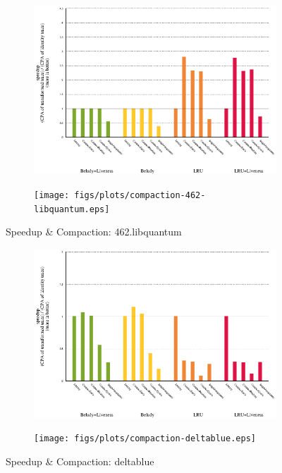 \begin{figure}[!ht]
  \begin{subfigure}[b]{0.5\textwidth}%
    \includegraphics[width=\textwidth]{figs/plots/speedup-462-libquantum.eps}
  \end{subfigure}%
  \begin{subfigure}[b]{0.5\textwidth}%
    \texttt{[image: figs/plots/compaction-462-libquantum.eps]}
  \end{subfigure}%
    \caption{Speedup \& Compaction: 462.libquantum}
  \label{fig:speedup-compaction-462-libquantum}
\end{figure}

\begin{figure}[!ht]
  \begin{subfigure}[b]{0.5\textwidth}%
    \includegraphics[width=\textwidth]{figs/plots/speedup-deltablue.eps}
  \end{subfigure}%
  \begin{subfigure}[b]{0.5\textwidth}%
    \texttt{[image: figs/plots/compaction-deltablue.eps]}
  \end{subfigure}%
    \caption{Speedup \& Compaction: deltablue}
  \label{fig:speedup-compaction-deltablue}
\end{figure}

